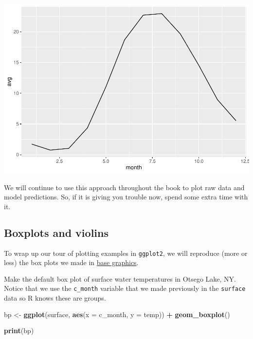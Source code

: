 \documentclass[
]{book}
\newenvironment{Shaded}{\begin{snugshade}}{\end{snugshade}}
\newcommand{\DataTypeTok}[1]{\textcolor[rgb]{0.13,0.29,0.53}{#1}}
\newcommand{\KeywordTok}[1]{\textcolor[rgb]{0.13,0.29,0.53}{\textbf{#1}}}
\newcommand{\NormalTok}[1]{#1}
\newcommand{\OperatorTok}[1]{\textcolor[rgb]{0.81,0.36,0.00}{\textbf{#1}}}
\newcommand{\StringTok}[1]{\textcolor[rgb]{0.31,0.60,0.02}{#1}}
\begin{document}
\includegraphics{worstr_files/figure-latex/unnamed-chunk-110-1.pdf}

We will continue to use this approach throughout the book to plot raw data and model predictions. So, if it is giving you trouble now, spend some extra time with it.

\hypertarget{ggboxplots}{%
\subsection{Boxplots and violins}\label{ggboxplots}}

To wrap up our tour of plotting examples in \texttt{ggplot2}, we will reproduce (more or less) the box plots we made in \protect\hyperlink{boxplots}{base graphics}.

Make the default box plot of surface water temperatures in Otsego Lake, NY. Notice that we use the \texttt{c\_month} variable that we made previously in the \texttt{surface} data so R knows these are groups.

\begin{Shaded}
\begin{Highlighting}[]
\NormalTok{bp <-}\StringTok{ }\KeywordTok{ggplot}\NormalTok{(surface, }\KeywordTok{aes}\NormalTok{(}\DataTypeTok{x =}\NormalTok{ c_month, }\DataTypeTok{y =}\NormalTok{ temp)) }\OperatorTok{+}\StringTok{ }\KeywordTok{geom_boxplot}\NormalTok{()}

\KeywordTok{print}\NormalTok{(bp)}
\end{Highlighting}
\end{Shaded}
\end{document}
